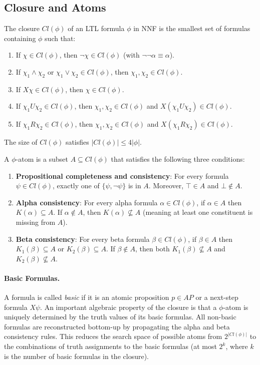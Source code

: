 \subsection{Closure and Atoms}
\begin{definition}[Closure]
The closure $Cl(\phi)$ of an LTL formula $\phi$ in NNF is the smallest set of formulas containing $\phi$ such that:
\begin{enumerate}
    \item If $\chi \in Cl(\phi)$, then $\neg\chi \in Cl(\phi)$ (with $\neg\neg\alpha \equiv \alpha$).
    \item If $\chi_1 \land \chi_2$ or $\chi_1 \lor \chi_2 \in Cl(\phi)$, then $\chi_1, \chi_2 \in Cl(\phi)$.
    \item If $X \chi \in Cl(\phi)$, then $\chi \in Cl(\phi)$.
    \item If $\chi_1 U \chi_2 \in Cl(\phi)$, then $\chi_1, \chi_2 \in Cl(\phi)$ and $X(\chi_1 U \chi_2) \in Cl(\phi)$.
    \item If $\chi_1 R \chi_2 \in Cl(\phi)$, then $\chi_1, \chi_2 \in Cl(\phi)$ and $X(\chi_1 R \chi_2) \in Cl(\phi)$.
\end{enumerate}
\end{definition}
The size of $Cl(\phi)$ satisfies $|Cl(\phi)| \le 4|\phi|$.
\begin{definition}
A $\phi$-atom is a subset $A \subseteq Cl(\phi)$ that satisfies the following three conditions:
\begin{enumerate}
    \item \textbf{Propositional completeness and consistency}: For every formula $\psi \in Cl(\phi)$, exactly one of $\{\psi, \neg \psi\}$ is in $A$. Moreover, $\top \in A$ and $\bot \notin A$.
    \item \textbf{Alpha consistency}: For every alpha formula $\alpha \in Cl(\phi)$, if $\alpha \in A$ then $K(\alpha) \subseteq A$. If $\alpha \notin A$, then $K(\alpha) \not\subseteq A$ (meaning at least one constituent is missing from $A$).
    \item \textbf{Beta consistency}: For every beta formula $\beta \in Cl(\phi)$, if $\beta \in A$ then $K_1(\beta) \subseteq A$ or $K_2(\beta) \subseteq A$. If $\beta \notin A$, then both $K_1(\beta) \not\subseteq A$ and $K_2(\beta) \not\subseteq A$.
\end{enumerate}
\end{definition}

\paragraph{Basic Formulas.}
A formula is called \emph{basic} if it is an atomic proposition $p \in AP$ or a next-step formula $X \psi$. An important algebraic property of the closure is that a $\phi$-atom is uniquely determined by the truth values of its basic formulas. All non-basic formulas are reconstructed bottom-up by propagating the alpha and beta consistency rules. This reduces the search space of possible atoms from $2^{|Cl(\phi)|}$ to the combinations of truth assignments to the basic formulas (at most $2^k$, where $k$ is the number of basic formulas in the closure).

